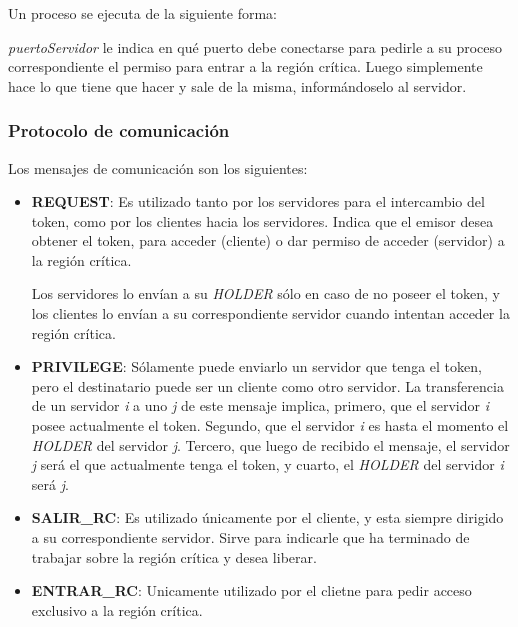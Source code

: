 \subsubsection{}

Un proceso  se ejecuta de la siguiente forma:


\emph{puertoServidor} le indica en qué puerto debe conectarse para pedirle a su
proceso  correspondiente el permiso para entrar a la región
crítica. Luego simplemente hace lo que tiene que hacer y sale de la misma,
informándoselo al servidor.


\subsubsection{Protocolo de comunicación}

Los mensajes de comunicación son los siguientes:

\begin{itemize}

\item \textbf{REQUEST}: Es utilizado tanto por los servidores para el
intercambio del token, como por los clientes hacia los servidores. Indica que
el emisor desea obtener el token, para acceder (cliente) o dar permiso de
acceder (servidor) a la región crítica.

Los servidores lo envían a su \emph{HOLDER} sólo en caso de no poseer el token,
y los clientes lo envían a su correspondiente servidor cuando intentan acceder
la región crítica.

\item \textbf{PRIVILEGE}: Sólamente puede enviarlo un servidor que tenga el
token, pero el destinatario puede ser un cliente como otro servidor. La
transferencia de un servidor \textsl{i} a uno \textsl{j} de este mensaje
implica, primero, que el servidor \textsl{i} posee actualmente el token.
Segundo, que el servidor \textsl{i} es hasta el momento el \emph{HOLDER} del
servidor \textsl{j}. Tercero, que luego de recibido el mensaje, el servidor
\textsl{j} será el que actualmente tenga el token, y cuarto, el \emph{HOLDER}
del servidor \textsl{i} será \textsl{j}.

\item \textbf{SALIR\_RC}: Es utilizado únicamente por el cliente, y esta siempre
dirigido a su correspondiente servidor. Sirve para indicarle que ha terminado
de trabajar sobre la región crítica y desea liberar.

\item \textbf{ENTRAR\_RC}: Unicamente utilizado por el clietne para pedir
acceso exclusivo a la región crítica.

\end{itemize}

